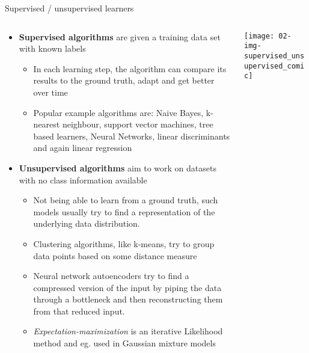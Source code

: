   \begin{frame}{Supervised / unsupervised learners}
    \begin{columns}[t]
      \begin{column}{0.65\textwidth}
        \begin{itemize}
          \item \textbf{Supervised algorithms} are given a training data set with known labels
          \begin{itemize}
            \item In each learning step, the algorithm can compare its results to the ground truth, adapt and get better over time
            \item Popular example algorithms are: Naive Bayes, k-nearest neighbour, support vector machines, tree based learners, Neural Networks, linear discriminants and again linear regression
          \end{itemize}
          \item \textbf{Unsupervised algorithms} aim to work on datasets with no class information available  %
          \begin{itemize}
            \item Not being able to learn from a ground truth, such models usually try to find a representation of the underlying data distribution.
            \item Clustering algorithms, like k-means, try to group data points based on some distance measure
            \item Neural network autoencoders try to find a compressed version of the input by piping the data through a bottleneck and then reconstructing them from that reduced input.
            \item \emph{Expectation-maximization} is an iterative Likelihood method and eg. used in Gaussian mixture models
          \end{itemize}
        \end{itemize}
      \end{column}
      \begin{column}{0.35\textwidth}
        \vspace*{1em}
        \texttt{[image: 02-img-supervised\_unsupervised\_comic]}
      \end{column}
    \end{columns}
  \end{frame}

